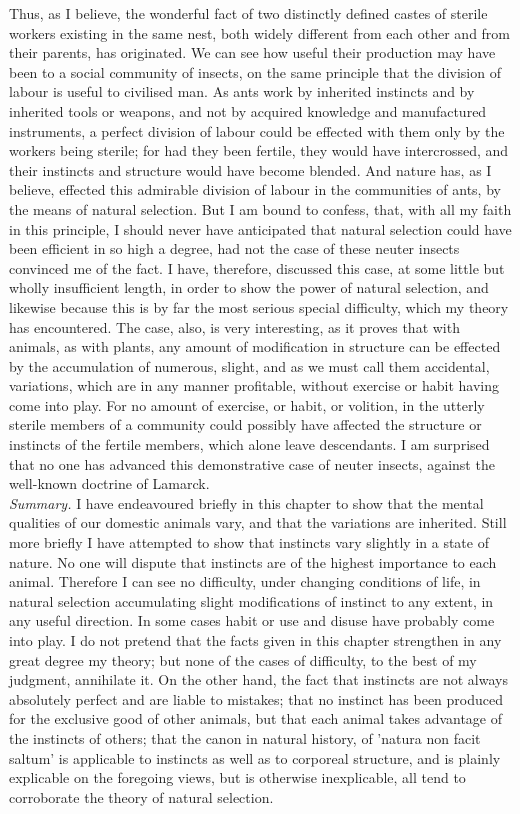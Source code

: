 \indent Thus, as I believe, the wonderful fact of two distinctly defined castes of sterile workers existing in the same nest, both widely different from each other and from their parents, has originated. We can see how useful their production may have been to a social community of insects, on the same principle that the division of labour is useful to civilised man. As ants work by inherited instincts and by inherited tools or weapons, and not by acquired knowledge and manufactured instruments, a perfect division of labour could be effected with them only by the workers being sterile; for had they been fertile, they would have intercrossed, and their instincts and structure would have become blended. And nature has, as I believe, effected this admirable division of labour in the communities of ants, by the means of natural selection. But I am bound to confess, that, with all my faith in this principle, I should never have anticipated that natural selection could have been efficient in so high a degree, had not the case of these neuter insects convinced me of the fact. I have, therefore, discussed this case, at some little but wholly insufficient length, in order to show the power of natural selection, and likewise because this is by far the most serious special difficulty, which my theory has encountered. The case, also, is very interesting, as it proves that with animals, as with plants, any amount of modification in structure can be effected by the accumulation of numerous, slight, and as we must call them accidental, variations, which are in any manner profitable, without exercise or habit having come into play. For no amount of exercise, or habit, or volition, in the utterly sterile members of a community could possibly have affected the structure or instincts of the fertile members, which alone leave descendants. I am surprised that no one has advanced this demonstrative case of neuter insects, against the well-known doctrine of Lamarck.\\
\indent \emph{Summary.} I have endeavoured briefly in this chapter to show that the mental qualities of our domestic animals vary, and that the variations are inherited. Still more briefly I have attempted to show that instincts vary slightly in a state of nature. No one will dispute that instincts are of the highest importance to each animal. Therefore I can see no difficulty, under changing conditions of life, in natural selection accumulating slight modifications of instinct to any extent, in any useful direction. In some cases habit or use and disuse have probably come into play. I do not pretend that the facts given in this chapter strengthen in any great degree my theory; but none of the cases of difficulty, to the best of my judgment, annihilate it. On the other hand, the fact that instincts are not always absolutely perfect and are liable to mistakes; that no instinct has been produced for the exclusive good of other animals, but that each animal takes advantage of the instincts of others; that the canon in natural history, of 'natura non facit saltum' is applicable to instincts as well as to corporeal structure, and is plainly explicable on the foregoing views, but is otherwise inexplicable, all tend to corroborate the theory of natural selection.\\
